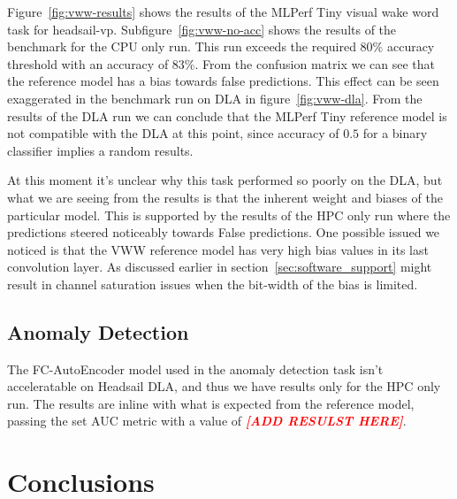 \documentclass[12pt,a4paper,english
]{tunithesis}
\newcommand{\fixthis}[1]{\textbf{\textit{\textcolor{red}{[#1]}}}}
\begin{document}
Figure~\ref{fig:vww-results} shows the results of the MLPerf Tiny visual wake word task for headsail-vp. Subfigure~\ref{fig:vww-no-acc} shows the results of the benchmark for the CPU only run. This run exceeds the required $80\%$ accuracy threshold with an accuracy of $83\%$. From the confusion matrix we can see that the reference model has a bias towards false predictions. This effect can be seen exaggerated in the benchmark run on DLA in figure~\ref{fig:vww-dla}. From the results of the DLA run we can conclude that the MLPerf Tiny reference model is not compatible with the DLA at this point, since accuracy of $0.5$ for a binary classifier implies a random results.

At this moment it's unclear why this task performed so poorly on the DLA, but what we are seeing from the results is that the inherent weight and biases of the particular model. This is supported by the results of the HPC only run where the predictions steered noticeably towards False predictions. One possible issued we noticed is that the VWW reference model has very high bias values in its last convolution layer. As discussed earlier in section~\ref{sec:software_support} might result in channel saturation issues when the bit-width of the bias is limited.

\section{Anomaly Detection}
The FC-AutoEncoder model used in the anomaly detection task isn't acceleratable on Headsail DLA, and thus we have results only for the HPC only run. The results are inline with what is expected from the reference model, passing the set AUC metric with a value of \fixthis{ADD RESULST HERE}.

\chapter{Conclusions}
\label{ch:conclusions}
\end{document}
